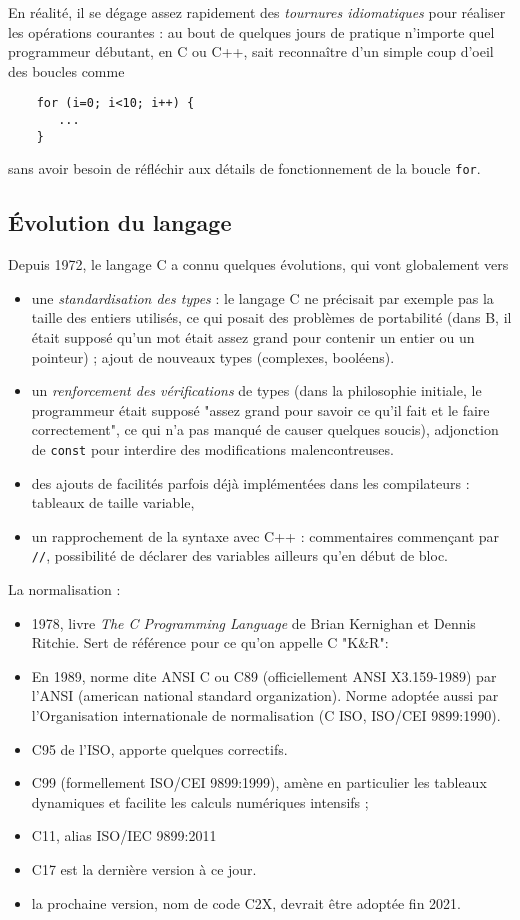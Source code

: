 \documentclass[10pt]{article}
\begin{document}
En réalité, il se dégage assez rapidement des \emph{tournures idiomatiques} 
pour réaliser les opérations courantes : au bout de quelques jours de pratique
n'importe quel programmeur débutant, en C ou C++, sait reconnaître
d'un simple coup d'oeil des boucles comme
\begin{verbatim}
	for (i=0; i<10; i++) {
	   ...
	}
\end{verbatim}
sans avoir besoin de réfléchir aux détails de fonctionnement de la boucle \texttt{for}.

\subsection{Évolution du langage}

Depuis 1972, le langage C a connu quelques évolutions, qui vont globalement
vers
\begin{itemize}
\item une \emph{standardisation des types} : le langage C ne précisait par
  exemple pas la taille des entiers utilisés, ce qui posait des
  problèmes de portabilité (dans B, il était supposé qu'un mot était
  assez grand pour contenir un entier ou un pointeur) ; ajout de
  nouveaux types (complexes, booléens).
\item un \emph{renforcement des vérifications} de types (dans la philosophie initiale,
le programmeur était supposé "assez grand pour savoir ce qu'il fait 
et le faire correctement", ce qui n'a pas manqué de causer quelques soucis),
adjonction de \texttt{const} pour interdire des modifications malencontreuses.
\item des ajouts de facilités parfois déjà implémentées dans les compilateurs : 
tableaux de taille variable, 
\item un rapprochement de la syntaxe avec C++ : commentaires commençant par \texttt{//},
possibilité de déclarer des variables ailleurs qu'en début de bloc.
\end{itemize}

La normalisation :

\begin{itemize}
\item 1978, livre \emph{The C Programming Language} de Brian Kernighan 
et Dennis Ritchie. Sert de référence pour ce qu'on
appelle C "K\&R":
\item En 1989, norme dite ANSI C ou C89 (officiellement ANSI X3.159-1989)
 par l'ANSI  (american national standard organization). Norme adoptée aussi 
 par l'Organisation internationale de normalisation (C ISO, ISO/CEI 9899:1990). 
\item C95 de l'ISO, apporte quelques correctifs.
\item C99 (formellement ISO/CEI 9899:1999), amène  en particulier 
les tableaux dynamiques et facilite les calculs numériques intensifs ;
\item C11, alias ISO/IEC 9899:2011
\item C17 est la dernière version à ce jour.
  \item la prochaine version, nom de code C2X, devrait être adoptée fin 2021.
\end{itemize}
\end{document}
